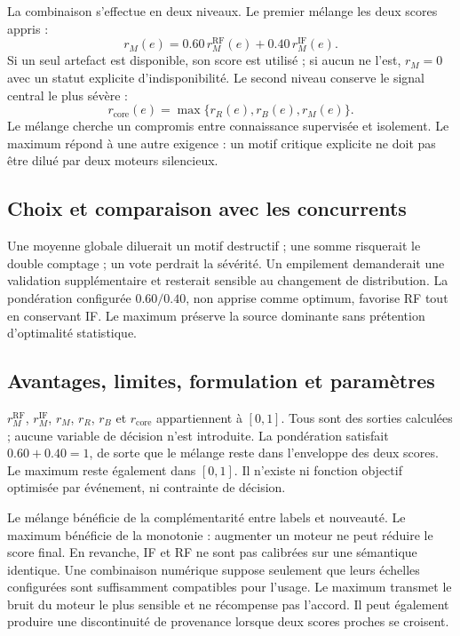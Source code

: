 \documentclass[11pt,a4paper,oneside]{report}
\theoremstyle{definition}
\theoremstyle{plain}
\begin{document}
La combinaison s'effectue en deux niveaux. Le premier mélange les deux scores appris :
\begin{equation}
r_M(e)=0.60\,r_M^{\mathrm{RF}}(e)+0.40\,r_M^{\mathrm{IF}}(e).
\label{eq:ai-ro-ml-blend}
\end{equation}
Si un seul artefact est disponible, son score est utilisé ; si aucun ne l'est, $r_M=0$ avec un statut explicite d'indisponibilité. Le second niveau conserve le signal central le plus sévère :
\begin{equation}
r_{\mathrm{core}}(e)=\max\{r_R(e),r_B(e),r_M(e)\}.
\label{eq:ai-ro-core-fusion}
\end{equation}
Le mélange cherche un compromis entre connaissance supervisée et isolement. Le maximum répond à une autre exigence : un motif critique explicite ne doit pas être dilué par deux moteurs silencieux.

\subsection*{Choix et comparaison avec les concurrents}

Une moyenne globale diluerait un motif destructif ; une somme risquerait le double comptage ; un vote perdrait la sévérité. Un empilement demanderait une validation supplémentaire et resterait sensible au changement de distribution. La pondération configurée $0.60/0.40$, non apprise comme optimum, favorise RF tout en conservant IF. Le maximum préserve la source dominante sans prétention d'optimalité statistique.

\subsection*{Avantages, limites, formulation et paramètres}

$r_M^{\mathrm{RF}}$, $r_M^{\mathrm{IF}}$, $r_M$, $r_R$, $r_B$ et
$r_{\mathrm{core}}$ appartiennent à $[0,1]$. Tous sont des sorties calculées ; aucune variable de décision n'est introduite. La pondération satisfait $0.60+0.40=1$, de sorte que le mélange reste dans l'enveloppe des deux scores. Le maximum reste également dans $[0,1]$. Il n'existe ni fonction objectif optimisée par événement, ni contrainte de décision.

Le mélange bénéficie de la complémentarité entre labels et nouveauté. Le maximum bénéficie de la monotonie : augmenter un moteur ne peut réduire le score final. En revanche, IF et RF ne sont pas calibrées sur une sémantique identique. Une combinaison numérique suppose seulement que leurs échelles configurées sont suffisamment compatibles pour l'usage. Le maximum transmet le bruit du moteur le plus sensible et ne récompense pas l'accord. Il peut également produire une discontinuité de provenance lorsque deux scores proches se croisent.
\end{document}
